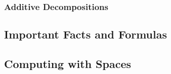 \subsubsection{Additive Decompositions}



\subsection{Important Facts and Formulas}

\subsection{Computing with Spaces}




